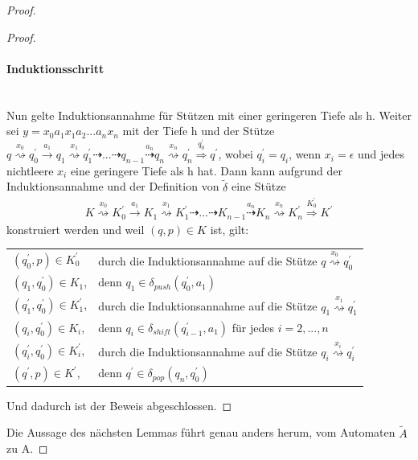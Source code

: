 \begin{proof}
\begin{proof}
\paragraph{Induktionsschritt}\ \\
Nun gelte Induktionsannahme für Stützen mit einer geringeren Tiefe als h. Weiter sei $y = x_0a_1x_1a_2...a_nx_n$ mit der Tiefe h und der Stütze $q \stackrel{x_0}{\rightsquigarrow} q_0^{\prime} \stackrel{a_1}{\rightarrow} q_1\stackrel{x_1}{\rightsquigarrow} q_1^{\prime} \dashrightarrow ... \dashrightarrow q_{n-1} \stackrel{a_n}{\dashrightarrow} q_n \stackrel{x_n}{\rightsquigarrow} q_n^{\prime} \stackrel {q_0^{\prime}} {\Rightarrow} q^\prime$, wobei $q_i^\prime = q_i$, wenn $x_i = \epsilon$ und jedes nichtleere $x_i$  eine geringere Tiefe als h hat. Dann kann aufgrund der Induktionsannahme und der Definition von $\tilde{\delta}$ eine Stütze
\begin{eqnarray*}
K \stackrel{x_0}{\rightsquigarrow} K_0^{\prime} \stackrel{a_1}{\rightarrow} K_1\stackrel{x_1}{\rightsquigarrow} K_1^{\prime} \dashrightarrow ... \dashrightarrow K_{n-1} \stackrel{a_n}{\dashrightarrow} K_n \stackrel{x_n}{\rightsquigarrow} K_n^{\prime} \stackrel {K_0^{\prime}} {\Rightarrow} K^\prime 
\end{eqnarray*}
konstruiert werden und weil $(q,p) \in K$ ist, gilt:\\[1ex]
\begin{tabular}[c] {l l}
$(q_0^\prime, p) \in K_0^\prime $  & durch die Induktionsannahme auf die Stütze $q \stackrel{x_0}{\rightsquigarrow} q_0^\prime$ \\
$ (q_1, q_0^\prime) \in K_1$, & denn $q_1 \in \delta_{push}(q_0^\prime, a_1)$ \\
$(q_1^\prime, q_0^\prime) \in K_1^\prime$, & durch die Induktionsannahme auf die Stütze $q_1 \stackrel{x_1}{\rightsquigarrow} q_1^\prime$\\ 
$ (q_i, q_0^\prime) \in K_i$, & denn $q_i \in \delta_{shift}(q_{i-1}^\prime, a_1)$ für jedes $i=2,...,n$ \\
$(q_i^\prime, q_0^\prime) \in K_i^\prime$, & durch die Induktionsannahme auf die Stütze $q_i \stackrel{x_i}{\rightsquigarrow} q_i^\prime$\\ 
$ (q^\prime, p) \in K^\prime$, & denn $q^\prime \in \delta_{pop}(q_n, q_0^\prime)$ \\
\end{tabular}
Und dadurch ist der Beweis abgeschlossen.
\end{proof}
Die Aussage des nächsten Lemmas führt genau anders herum, vom Automaten $\tilde{A}$ zu A.

\end{proof}
